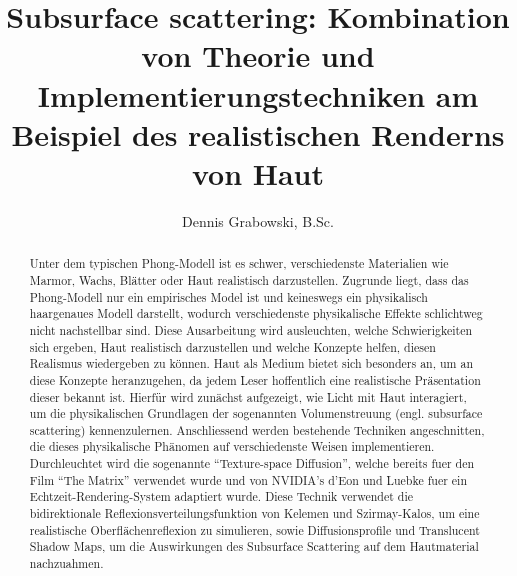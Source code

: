 \documentclass[ngerman,runningheads,a4paper]{llncs}[2018/03/10]
\begin{document}
\title{Subsurface scattering: Kombination von Theorie und Implementierungstechniken am Beispiel des realistischen Renderns von Haut}
{}

\author{Dennis Grabowski, B.Sc.}
{}


\maketitle

\begin{abstract}

Unter dem typischen Phong-Modell ist es schwer, verschiedenste Materialien wie Marmor, Wachs, Blätter oder Haut realistisch dar\-zu\-stellen.
Zugrunde liegt, dass das Phong-Modell nur ein empirisches Model ist und keineswegs ein physikalisch haargenaues Modell darstellt, wodurch verschiedenste physikalische Effekte schlichtweg nicht nachstellbar sind.
Diese Ausarbeitung wird ausleuchten, welche Schwierigkeiten sich ergeben, Haut realistisch darzustellen und welche Konzepte helfen, diesen Realismus wiedergeben zu können.
Haut als Medium bietet sich besonders an, um an diese Konzepte heranzugehen, da jedem Leser hoffentlich eine realistische Präsentation dieser bekannt ist.
Hierfür wird zunächst aufgezeigt, wie Licht mit Haut interagiert, um die physikalischen Grundlagen der sogenannten Volumenstreuung (engl. subsurface scattering) kennenzulernen.
Anschliessend werden bestehende Techniken angeschnitten, die dieses physikalische Phänomen auf verschiedenste Weisen implementieren.
Durchleuchtet wird die sogenannte \enquote{Texture-space Diffusion}, welche bereits fuer den Film \enquote{The Matrix} verwendet wurde und von NVIDIA's d'Eon und Luebke fuer ein Echtzeit-Rendering-System adaptiert wurde.
Diese Technik verwendet die bidirektionale Reflexionsverteilungsfunktion von Kelemen und Szirmay-Kalos, um eine realistische Oberflächenreflexion zu simulieren, sowie Diffusionsprofile und Translucent Shadow Maps, um die Auswirkungen des Subsurface Scattering auf dem Hautmaterial nachzuahmen.

\end{abstract}
\end{document}
